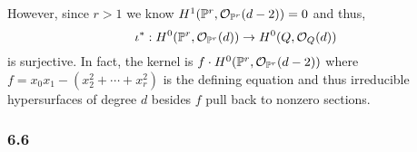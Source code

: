 \documentclass[12pt]{article}
\begin{document}
\begin{enumerate}
\begin{center}
\end{center}
However, since $r > 1$ we know $H^1(\mathbb{P}^r, \mathcal{O}_{\mathbb{P}^r}(d-2)) = 0$ and thus,
\[ \iota^* : H^0(\mathbb{P}^r, \mathcal{O}_{\mathbb{P}^r}(d)) \to H^0(Q, \mathcal{O}_{Q}(d)) \]
is surjective. In fact, the kernel is $f \cdot H^0(\mathbb{P}^r, \mathcal{O}_{\mathbb{P}^r}(d-2))$ where $f = x_0 x_1 - (x_2^2 + \cdots + x_r^2)$ is the defining equation and thus irreducible hypersurfaces of degree $d$ besides $f$ pull back to nonzero sections.
\end{enumerate}

\subsubsection{6.6}
\end{document}
